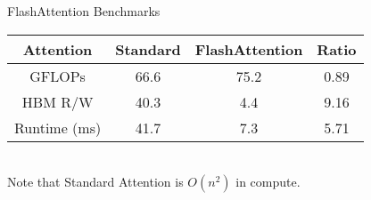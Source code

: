 \begin{frame}[c]{FlashAttention Benchmarks}
    \large
    \begin{tabular}{c|ccc}
        Attention & Standard & FlashAttention & Ratio \\ \hline
        GFLOPs & 66.6  & 75.2 & 0.89 \\
        HBM R/W & 40.3 & 4.4 & 9.16 \\
        Runtime (ms) & 41.7 & 7.3 & 5.71 \\
    \end{tabular} \newline \newline
    \normalsize
     \\
    \large
    Note that Standard Attention is $O(n^2)$ in compute.
\end{frame}



